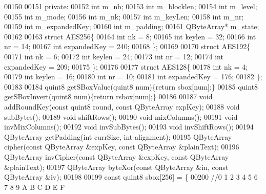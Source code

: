 \begin{DoxyCode}
00150 
00151 \textcolor{keyword}{private}:
00152     \textcolor{keywordtype}{int} m\_nb;
00153     \textcolor{keywordtype}{int} m\_blocklen;
00154     \textcolor{keywordtype}{int} m\_level;
00155     \textcolor{keywordtype}{int} m\_mode;
00156     \textcolor{keywordtype}{int} m\_nk;
00157     \textcolor{keywordtype}{int} m\_keyLen;
00158     \textcolor{keywordtype}{int} m\_nr;
00159     \textcolor{keywordtype}{int} m\_expandedKey;
00160     \textcolor{keywordtype}{int} m\_padding;
00161     QByteArray* m\_state;
00162 
00163     \textcolor{keyword}{struct }AES256\{
00164         \textcolor{keywordtype}{int} nk = 8;
00165         \textcolor{keywordtype}{int} keylen = 32;
00166         \textcolor{keywordtype}{int} nr = 14;
00167         \textcolor{keywordtype}{int} expandedKey = 240;
00168     \};
00169 
00170     \textcolor{keyword}{struct }AES192\{
00171         \textcolor{keywordtype}{int} nk = 6;
00172         \textcolor{keywordtype}{int} keylen = 24;
00173         \textcolor{keywordtype}{int} nr = 12;
00174         \textcolor{keywordtype}{int} expandedKey = 209;
00175     \};
00176 
00177     \textcolor{keyword}{struct }AES128\{
00178         \textcolor{keywordtype}{int} nk = 4;
00179         \textcolor{keywordtype}{int} keylen = 16;
00180         \textcolor{keywordtype}{int} nr = 10;
00181         \textcolor{keywordtype}{int} expandedKey = 176;
00182     \};
00183 
00184     quint8 getSBoxValue(quint8 num)\{\textcolor{keywordflow}{return} sbox[num];\}
00185     quint8 getSBoxInvert(quint8 num)\{\textcolor{keywordflow}{return} rsbox[num];\}
00186 
00187     \textcolor{keywordtype}{void} addRoundKey(\textcolor{keyword}{const} quint8 round, \textcolor{keyword}{const} QByteArray expKey);
00188     \textcolor{keywordtype}{void} subBytes();
00189     \textcolor{keywordtype}{void} shiftRows();
00190     \textcolor{keywordtype}{void} mixColumns();
00191     \textcolor{keywordtype}{void} invMixColumns();
00192     \textcolor{keywordtype}{void} invSubBytes();
00193     \textcolor{keywordtype}{void} invShiftRows();
00194     QByteArray getPadding(\textcolor{keywordtype}{int} currSize, \textcolor{keywordtype}{int} alignment);
00195     QByteArray cipher(\textcolor{keyword}{const} QByteArray &expKey, \textcolor{keyword}{const} QByteArray &plainText);
00196     QByteArray invCipher(\textcolor{keyword}{const} QByteArray &expKey, \textcolor{keyword}{const} QByteArray &plainText);
00197     QByteArray byteXor(\textcolor{keyword}{const} QByteArray &in, \textcolor{keyword}{const} QByteArray &iv);
00198 
00199     \textcolor{keyword}{const} quint8 sbox[256] =   \{
00200       \textcolor{comment}{//0     1    2      3     4    5     6     7      8    9     A      B    C     D     E     F}

\end{DoxyCode}
